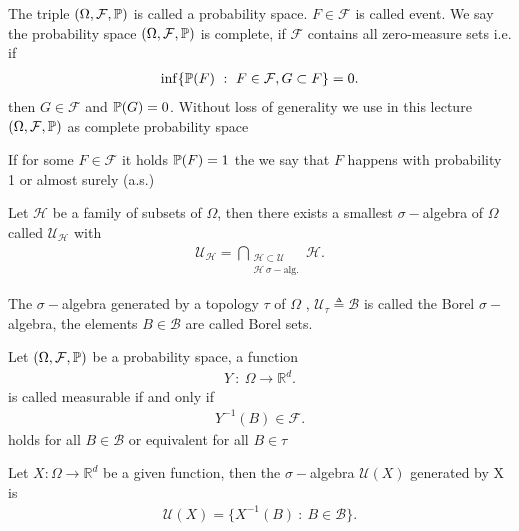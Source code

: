 \begin{definition}
 The triple $(\Omega ,\mathcal{F},\P)$  is called a probability space. $F \in  \mathcal{F}$ is called
 event. We say the probability space $(\Omega ,\mathcal{F},\P)$ is complete, if $\mathcal{F}$ contains all zero-measure sets i.e.
 if 
 \begin{align*}
  \inf \{\P(F) \ : \ F \in  \mathcal{F},G \subset  F\}  = 0
 .\end{align*}
 then $G \in  \mathcal{F}$ and $\P(G) = 0$. Without loss of generality we use in this lecture $(\Omega ,\mathcal{F},\P)$
 as complete probability space
\end{definition}
\begin{definition}
  If for some $F \in  \mathcal{F}$ it holds $\P(F) = 1$ the we say that $F$ happens with 
  probability 1 or almost surely (a.s.)
\end{definition}
\begin{remark}
 Let $\mathcal{H}$  be a family of subsets of $\Omega$, then there exists a smallest $\sigma-$algebra of 
 $\Omega$ called $\mathcal{U}_{\mathcal{H}}$ with 
 \begin{align*}
   \mathcal{U}_{\mathcal{H}} = \bigcap_{\substack{\mathcal{H} \subset \mathcal{U} \\ \mathcal{H} \ \sigma-\text{alg.}}} \mathcal{H}  
 .\end{align*}
\end{remark}
\begin{example}
  The $\sigma-$algebra generated by a topology $\tau $ of $\Omega$ , $\mathcal{U}_{\tau } \triangleq \mathcal{B}$ is called 
  the Borel $\sigma-$algebra, the elements $B \in  \mathcal{B}$ are called Borel sets.
\end{example}
\begin{definition}
 Let $(\Omega ,\mathcal{F},\P)$  be a probability space, a function 
 \begin{align*}
  Y \ : \ \Omega  \to \mathbb{R}^{d} 
 .\end{align*}
 is called measurable if and only if 
 \begin{align*}
  Y^{-1}(B) \in  \mathcal{F} 
 .\end{align*}
 holds for all $B \in  \mathcal{B}$ or equivalent for all $B \in  \tau $
\end{definition}
\begin{example}
 Let $X : \Omega  \to  \mathbb{R}^{d} $  be a given function, then the $\sigma-$algebra $\mathcal{U}(X)$ generated by X is 
 \begin{align*}
  \mathcal{U}(X) = \{X^{-1}(B) \ : \ B \in  \mathcal{B} \}  
 .\end{align*}
\end{example}
